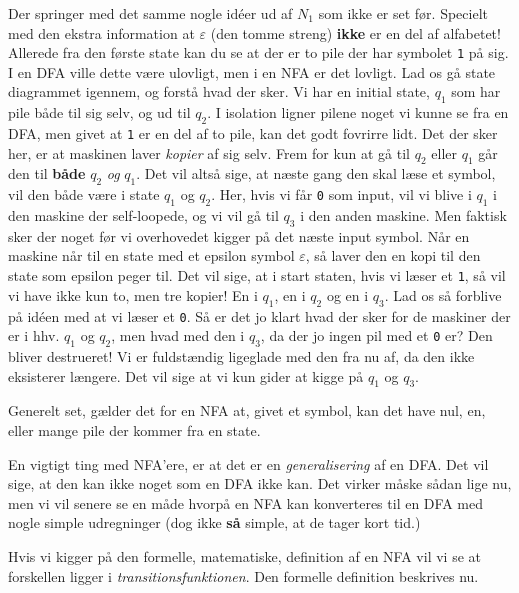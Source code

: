 Der springer med det samme nogle idéer ud af $N_{1}$ som ikke er set før. Specielt med den ekstra information at $\varepsilon$ (den tomme streng) \textbf{ikke} er en del af alfabetet! Allerede fra den første state kan du se at der er to pile der har symbolet \texttt{1} på sig. I en DFA ville dette være ulovligt, men i en NFA er det lovligt. Lad os gå state diagrammet igennem, og forstå hvad der sker. Vi har en initial state, $q_{1}$ som har pile både til sig selv, og ud til $q_{2}$. I isolation ligner pilene noget vi kunne se fra en DFA, men givet at \texttt{1} er en del af to pile, kan det godt fovrirre lidt. Det der sker her, er at maskinen laver \textit{kopier} af sig selv. Frem for kun at gå til $q_{2}$ eller $q_{1}$ går den til \textbf{både} $q_{2}$ \textit{og} $q_{1}$. Det vil altså sige, at næste gang den skal læse et symbol, vil den både være i state $q_{1}$ og $q_{2}$. Her, hvis vi får \texttt{0} som input, vil vi blive i $q_{1}$ i den maskine der self-loopede, og vi vil gå til $q_{3}$ i den anden maskine. Men faktisk sker der noget før vi overhovedet kigger på det næste input symbol. Når en maskine når til en state med et epsilon symbol $\varepsilon$, så laver den en kopi til den state som epsilon peger til. Det vil sige, at i start staten, hvis vi læser et \texttt{1}, så vil vi have ikke kun to, men tre kopier! En i $q_{1}$, en i $q_{2}$ og en i $q_{3}$. Lad os så forblive på idéen med at vi læser et \texttt{0}. Så er det jo klart hvad der sker for de maskiner der er i hhv. $q_{1}$ og $q_{2}$, men hvad med den i $q_{3}$, da der jo ingen pil med et \texttt{0} er? Den bliver destrueret! Vi er fuldstændig ligeglade med den fra nu af, da den ikke eksisterer længere. Det vil sige at vi kun gider at kigge på $q_{1}$ og $q_{3}$.

Generelt set, gælder det for en NFA at, givet et symbol, kan det have nul, en, eller mange pile der kommer fra en state.

En vigtigt ting med NFA'ere, er at det er en \textit{generalisering} af en DFA. Det vil sige, at den kan ikke noget som en DFA ikke kan. Det virker måske sådan lige nu, men vi vil senere se en måde hvorpå en NFA kan konverteres til en DFA med nogle simple udregninger (dog ikke \textbf{så} simple, at de tager kort tid.)

Hvis vi kigger på den formelle, matematiske, definition af en NFA vil vi se at forskellen ligger i \textit{transitionsfunktionen}. Den formelle definition beskrives nu.

